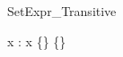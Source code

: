 \begin{zsection}
  \SECTION SetExpr\_Transitive
\end{zsection}

\begin{axdef}
  x : \power \nat
\where
  x \in \{\} \in \{\}
\end{axdef}

